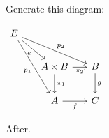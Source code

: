 \documentclass[11pt]{article}
\begin{document}
Generate this diagram:
\par\noindent
\begin{minipage}[t]{0.49\linewidth}
  \centering
  $
    \begin{tikzcd}[row sep=2em, column sep=1.5em, ampersand replacement=\&]
      E
        \arrow[dr, "e"']
        \arrow[drr, "p_2"]
        \arrow[ddr, "p_1"']
      \& \& \\
      \& A \times B \arrow[r, "\pi_2"'] \arrow[d, "\pi_1"] \& B \arrow[d, "g"] \\
      \& A \arrow[r, "f"'] \& C
    \end{tikzcd}
  $
\end{minipage}
\par
After.
\end{document}
